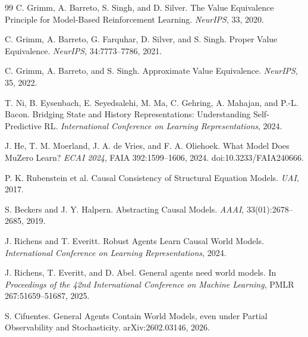 \documentclass[10pt]{article}
\begin{document}
\begin{thebibliography}{99}
C. Grimm, A. Barreto, S. Singh, and D. Silver.
The Value Equivalence Principle for Model-Based Reinforcement Learning.
\emph{NeurIPS}, 33, 2020.

C. Grimm, A. Barreto, G. Farquhar, D. Silver, and S. Singh.
Proper Value Equivalence.
\emph{NeurIPS}, 34:7773--7786, 2021.

C. Grimm, A. Barreto, and S. Singh.
Approximate Value Equivalence.
\emph{NeurIPS}, 35, 2022.

T. Ni, B. Eysenbach, E. Seyedsalehi, M. Ma, C. Gehring, A. Mahajan, and P.-L. Bacon.
Bridging State and History Representations: Understanding Self-Predictive RL.
\emph{International Conference on Learning Representations}, 2024.

J. He, T. M. Moerland, J. A. de Vries, and F. A. Oliehoek.
What Model Does MuZero Learn?
\emph{ECAI 2024}, FAIA 392:1599--1606, 2024.
doi:10.3233/FAIA240666.

P. K. Rubenstein et al.
Causal Consistency of Structural Equation Models.
\emph{UAI}, 2017.

S. Beckers and J. Y. Halpern.
Abstracting Causal Models.
\emph{AAAI}, 33(01):2678--2685, 2019.

J. Richens and T. Everitt.
Robust Agents Learn Causal World Models.
\emph{International Conference on Learning Representations}, 2024.

J. Richens, T. Everitt, and D. Abel.
General agents need world models.
In \emph{Proceedings of the 42nd International Conference on Machine Learning}, PMLR 267:51659--51687, 2025.

S. Cifuentes.
General Agents Contain World Models, even under Partial Observability and Stochasticity.
arXiv:2602.03146, 2026.

\end{thebibliography}
\end{document}
